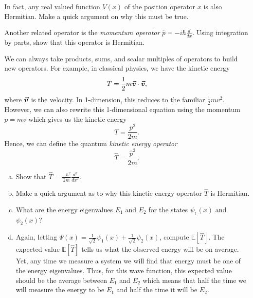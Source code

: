 \documentclass[12pt]{article} %
\begin{document}
\begin{problem}
	In fact, any real valued function $V(x)$ of the position operator $x$ is also Hermitian. Make a quick argument on why this must be true.
\end{problem}

\begin{problem}
	Another related operator is the \emph{momentum operator} $\hat{p} = -i\hbar \frac{d}{dx}$. Using integration by parts, show that this operator is Hermitian.
\end{problem}

\begin{problem}
	We can always take products, sums, and scalar multiples of operators to build new operators.  For example, in classical physics, we have the kinetic energy
	\[
	T=\frac{1}{2}m \boldsymbol{\vec{v}} \cdot \boldsymbol{\vec{v}},
	\]
	where $\boldsymbol{\vec{v}}$ is the velocity. In 1-dimension, this reduces to the familiar $\frac{1}{2}mv^2$.  However, we can also rewrite this 1-dimensional equation using the momentum $p=mv$ which gives us the kinetic energy
	\[
	T=\frac{p^2}{2m}.
	\]
	Hence, we can define the quantum \emph{kinetic energy operator}
	\[
	\hat{T}=\frac{\hat{p}^2}{2m}.
	\]
	\begin{enumerate}[(a)]
		\item Show that $\hat{T} = \frac{-\hbar^2}{2m}\frac{d^2}{dx^2}$.
		\item Make a quick argument as to why this kinetic energy operator $\hat{T}$ is Hermitian.
		\item What are the energy eigenvalues $E_1$ and $E_2$ for the states $\psi_1(x)$ and $\psi_2(x)$?
		\item Again, letting $\Psi(x)=\frac{1}{\sqrt{2}}\psi_1(x)+\frac{1}{\sqrt{2}}\psi_2(x)$, compute $\mathbb{E}[\hat{T}]$. The expected value $\mathbb{E}[\hat{T}]$ tells us what the observed energy will be on average. Yet, any time we measure a system we will find that energy must be one of the energy eigenvalues. Thus, for this wave function, this expected value should be the average between $E_1$ and $E_2$ which means that half the time we will measure the energy to be $E_1$ and half the time it will be $E_2$.
	\end{enumerate}	
\end{problem}
\end{document}
